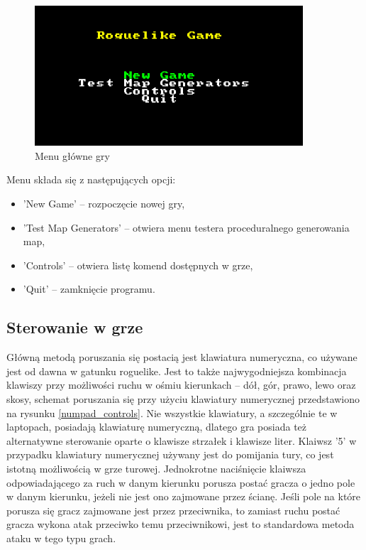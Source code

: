 \documentclass[12pt,twoside]{article}
\begin{document}
\FloatBarrier
\begin{figure}[h]
	\centering
	\includegraphics[width=10cm]{images/mygame/scr1.png}
	\caption{Menu główne gry}
	\label{mygame:scr1}
\end{figure}
\FloatBarrier

Menu składa się z następujących opcji:
\begin{itemize}
	\item 'New Game' -- rozpoczęcie nowej gry,
	\item 'Test Map Generators' -- otwiera menu testera proceduralnego generowania map,			
	\item 'Controls' -- otwiera listę komend dostępnych w grze,
	\item 'Quit' -- zamknięcie programu.
\end{itemize}


\subsection{Sterowanie w grze}
 Główną metodą poruszania się postacią jest klawiatura numeryczna, co używane jest od dawna w gatunku roguelike. Jest to także najwygodniejsza kombinacja klawiszy przy możliwości ruchu w ośmiu kierunkach -- dół, gór, prawo, lewo oraz skosy, schemat poruszania się przy użyciu klawiatury numerycznej przedstawiono na rysunku \ref{numpad_controls}. Nie wszystkie klawiatury, a szczególnie te w laptopach, posiadają klawiaturę numeryczną, dlatego gra posiada też alternatywne sterowanie oparte o klawisze strzałek i klawisze liter. Klaiwsz '5' w przypadku klawiatury numerycznej używany jest do pomijania tury, co jest istotną możliwością w grze turowej. Jednokrotne naciśnięcie klaiwsza odpowiadającego za ruch w danym kierunku porusza postać gracza o jedno pole w danym kierunku, jeżeli nie jest ono zajmowane przez ścianę. Jeśli pole na które porusza się gracz zajmowane jest przez przeciwnika, to zamiast ruchu postać gracza wykona atak przeciwko temu przeciwnikowi, jest to standardowa metoda ataku w tego typu grach.
 
\end{document}
